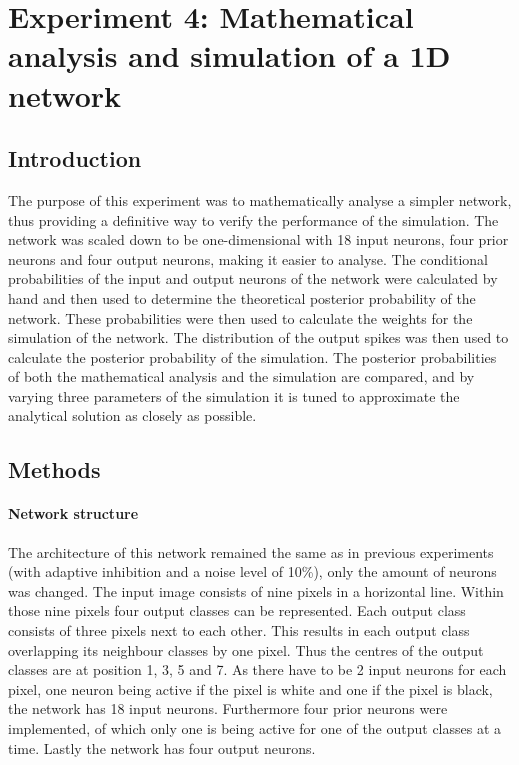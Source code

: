 \section{Experiment 4: Mathematical analysis and simulation of a 1D network}
\label{section:1D}

\subsection{Introduction}

The purpose of this experiment was to mathematically analyse a simpler network, thus providing a definitive way to verify the performance of the simulation. The network was scaled down to be one-dimensional with 18 input neurons, four prior neurons and four output neurons, making it easier to analyse. The conditional probabilities of the input and output neurons of the network  were calculated by hand and then used to determine the theoretical posterior probability of the network. These probabilities were then used to calculate the weights for the simulation of the network. The distribution of the output spikes was then used to calculate the posterior probability of the simulation. The posterior probabilities of both the mathematical analysis and the simulation are compared, and by varying three parameters of the simulation it is tuned to approximate the analytical solution as closely as possible.

\subsection{Methods}

\paragraph{Network structure}
The architecture of this network remained the same as in previous experiments (with adaptive inhibition and a noise level of 10\%), only the amount of neurons was changed. The input image consists of nine pixels in a horizontal line. Within those nine pixels four output classes can be represented. Each output class consists of three pixels next to each other. This results in each output class overlapping its neighbour classes by one pixel. Thus the centres of the output classes are at position 1, 3, 5 and 7.    As there have to be 2 input neurons for each pixel, one neuron being active if the pixel is white and one if the pixel is black, the network has 18 input neurons. Furthermore four prior neurons were implemented, of which only one is being active for one of the output classes at a time. Lastly the network has four output neurons.

